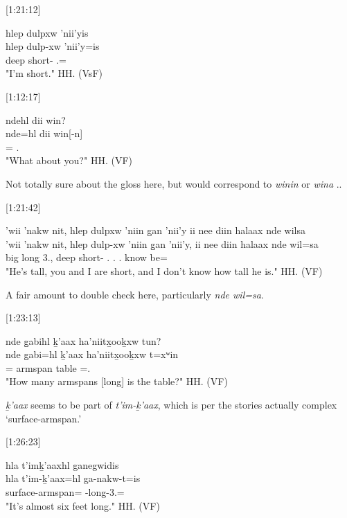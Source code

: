 [1:21:12]
\begin{exe}
    \ex \glll
    hlep dulpxw 'nii'yis \\
    hlep dulp-xw 'nii'y=is \\
    deep short-\Val{} \Fsg.\Iii=\Qudd \\
    \glt "I'm short." \hfill HH.\ElicitationDate{} (VsF)
\end{exe}

[1:12:17]
\begin{exe}
    \ex \glll
    ndehl dii win? \\
    nde=hl dii win[-n] \\
    \Wh=\Cn{} \Foc{} .\I \\
    \glt "What about you?" \hfill HH.\ElicitationDate{} (VF)
\end{exe}

Not totally sure about the gloss here, but would correspond to \textit{winin} or \textit{wina} .\I.

[1:21:42]
\begin{exe}
    \ex \glll
    'wii 'nakw nit, hlep dulpxw 'niin g̱an 'nii'y ii nee diin halaax nde wilsa \\
    'wii 'nakw nit, hlep dulp-xw 'niin g̱an 'nii'y, ii nee diin halaax nde wil=sa \\
    big long 3.\Iii, deep short-\Val{} \Ssg.\Iii{} \Pcnj{} \Fsg.\Iii{} \Ccnj{} \Neg{} .\I{} know be=\Prox{} \\
    \glt "He's tall, you and I are short, and I don't know how tall he is." \hfill HH.\ElicitationDate{} (VF)
\end{exe}

A fair amount to double check here, particularly \textit{nde wil=sa}.

[1:23:13]
\begin{exe}
    \ex \glll
    nde g̱abihl ḵ’aax ha'niitx̱ooḵxw tun? \\
    nde g̱abi=hl ḵ’aax ha'niitx̱ooḵxw t=xʷin \\
    \Wh \Cnt=\Cn{} armspan table \Pn=\Dem.\Prox \\
    \glt "How many armspans [long] is the table?" \hfill HH.\ElicitationDate{} (VF)
\end{exe}

\textit{ḵ’aax} seems to be part of \textit{t’im-ḵ’aax}, which is per the stories actually complex `surface-armspan.'

[1:26:23]
\begin{exe}
    \ex \glll
    hla t’imḵ’aaxhl ganegwidis \\
    hla t’im-ḵ’aax=hl ga-nakw-t=is \\
    \Part{} surface-armspan=\Cn{} \Distr-long-3.\Ii=\Qudd \\
    \glt "It's almost six feet long." \hfill HH.\ElicitationDate{} (VF)
\end{exe}

